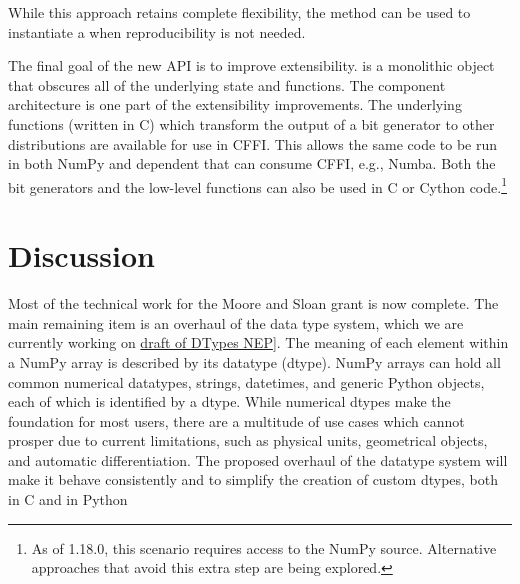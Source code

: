 \noindent While this approach retains complete flexibility, the method
 can be used to instantiate a  when
reproducibility is not needed.

The final goal of the new API is to improve extensibility.  is
a monolithic object that obscures all of the underlying state and functions. The
component architecture is one part of the extensibility improvements. The
underlying functions (written in C) which transform the output of a bit
generator to other distributions are available for use in CFFI. This allows the
same code to be run in both NumPy and dependent that can consume CFFI, e.g.,
Numba. Both the bit generators and the low-level functions can also be used in C
or Cython code.\footnote{As of 1.18.0, this scenario requires access to the
NumPy source. Alternative approaches that avoid this extra step are being
explored.} 

\section{Discussion}


Most of the technical work for the Moore and Sloan grant is now complete.
The main remaining item is an overhaul of the data type system, which
we are currently working on \href{https://github.com/numpy/numpy/pull/14422}{draft of DTypes NEP}].
The meaning of each element within a NumPy array is described by its
datatype (dtype). NumPy arrays can hold all common numerical
datatypes, strings, datetimes, and generic Python objects, each of
which is identified by a dtype.
While numerical dtypes make the foundation for most users,
there are a multitude of use cases which cannot prosper due to current
limitations, such as physical units\cite{astropy,Goldbaum2018,pint},
geometrical objects\cite{pygeos}, and automatic
differentiation\cite{pyadolc}.
The proposed overhaul of the datatype system will make it behave consistently and
to simplify the creation of custom dtypes, both in C and in Python

